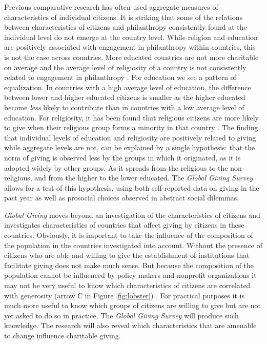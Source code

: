 \documentclass[twocolumn, serif, rga, numeric]{jote-article}
\begin{document}
Previous comparative research has often used aggregate measures of characteristics of individual citizens. It is striking that some of the relations between characteristics of citizens and philanthropy consistently found at the individual level do not emerge at the country level. While religion and education are positively associated with engagement in philanthropy within countries, this is not the case across countries. More educated countries are not more charitable on average \cite{Gesthuizen2008} and the average level of religiosity of a country is not consistently related to engagement in philanthropy \cite{Wiepking2014}. For education we see a pattern of equalization. In countries with a high average level of education, the difference between lower and higher educated citizens is smaller as the higher educated become \emph{less} likely to contribute than in countries with a low average level of education. For religiosity, it has been found that religious citizens are more likely to give when their religious group forms a minority in that country \cite{Wiepking2014}. The finding that individual levels of education and religiosity are positively related to giving while aggregate levels are not, can be explained by a single hypothesis: that the norm of giving is observed less by the groups in which it originated, as it is adopted widely by other groups. As it spreads from the religious to the non-religious, and from the higher to the lower educated. The \emph{Global Giving Survey} allows for a test of this hypothesis, using both self-reported data on giving in the past year as well as prosocial choices observed in abstract social dilemmas.

\emph{Global Giving} moves beyond an investigation of the characteristics of citizens and investigates characteristics of countries that affect giving by citizens in these countries. Obviously, it is important to take the influence of the composition of the population in the countries investigated into account. Without the presence of citizens who are able and willing to give the establishment of institutions that facilitate giving does not make much sense. But because the composition of the population cannot be influenced by policy makers and nonprofit organizations it may not be very useful to know which characteristics of citizens are correlated with generosity (arrow C in Figure \ref{fig:lobster}) \cite{Minkov2017}. For practical purposes it is much more useful to know which groups of citizens are willing to give but are not yet asked to do so in practice. The \emph{Global Giving Survey} will produce such knowledge. The research will also reveal which characteristics that are amenable to change influence charitable giving.
\end{document}
